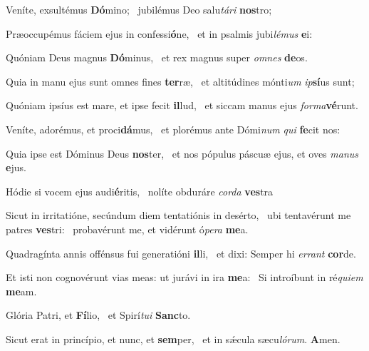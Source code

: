\item Veníte, exsultémus \textbf{Dó}mino;~\psstar{} jubilémus Deo salu\textit{tári} \textbf{nos}tro;

\item Præoccupémus fáciem ejus in confessi\textbf{ó}ne,~\psstar{} et in psalmis jubi\textit{lémus} \textbf{e}i:

\item Quóniam Deus magnus \textbf{Dó}minus,~\psstar{} et rex magnus super \textit{omnes} \textbf{de}os.

\item Quia in manu ejus sunt omnes fines \textbf{ter}ræ,~\psstar{} et altitúdines mónti\textit{um} \textit{ip}\textbf{sí}us sunt;\\

\item Quóniam ipsíus est mare, et ipse fecit \textbf{il}lud,~\psstar{} et siccam manus ejus \textit{forma}\textbf{vé}runt.

\item Veníte, adorémus, et proci\textbf{dá}mus,~\psstar{} et plorémus ante Dómi\textit{num} \textit{qui} \textbf{fe}cit nos:

\item Quia ipse est Dóminus Deus \textbf{nos}ter,~\psstar{} et nos pópulus páscuæ ejus, et oves \textit{manus} \textbf{e}jus.\\

\item Hódie si vocem ejus audi\textbf{é}ritis,~\psstar{} nolíte obduráre \textit{corda} \textbf{ves}tra

\item Sicut in irritatióne, secúndum diem tentatiónis in desérto,~\pscross{} ubi tentavérunt me patres \textbf{ves}tri:~\psstar{} probavérunt me, et vidérunt ó\textit{pera} \textbf{me}a.

\item Quadragínta annis offénsus fui generatióni \textbf{il}li,~\psstar{} et dixi: Semper hi \textit{errant} \textbf{cor}de.

\item Et isti non cognovérunt vias meas: ut jurávi in ira \textbf{me}a:~\psstar{} Si introíbunt in ré\textit{quiem} \textbf{me}am.

\item Glória Patri, et \textbf{Fí}lio,~\psstar{} et Spirí\textit{tui} \textbf{Sanc}to.

\item Sicut erat in princípio, et nunc, et \textbf{sem}per,~\psstar{} et in sǽcula sæcu\textit{lórum}. \textbf{A}men.\\

